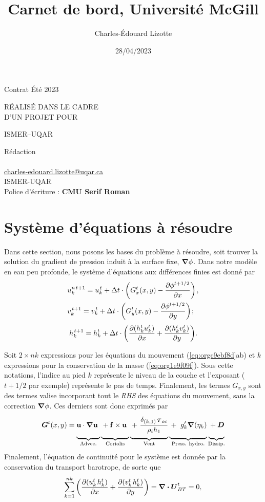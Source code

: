\documentclass[10pt]{article}
\author{Charles-Édouard Lizotte}
\date{28/04/2023}
\title{Carnet de bord, Université McGill}
\makeatletter
\numberwithin{equation}{section}
\newcommand{\uu}{\vb{u}}
\newcommand{\venti}{\vphantom{\sum_x^x}}
\newcommand{\pt}{\hspace{1pt}} %
\newcommand{\mytitlepage}{
\begin{titlepage}
\begin{center}
{\Huge \thesubtitle \par}
\vspace{2cm}
{\Huge \MakeUppercase{\thetitle} \par}
\vspace{2cm}
RÉALISÉ DANS LE CADRE\\ D'UN PROJET POUR \par
\vspace{2cm}
{\Huge ISMER--UQAR \par}
\vspace{2cm}
{\thedate}
\end{center}
\vfill
Rédaction \\
{\theauthor}\\
\url{charles-edouard.lizotte@uqar.ca}\\
ISMER-UQAR\\
Police d'écriture : \textbf{CMU Serif Roman}
\end{titlepage}
}
\newcommand{\thesubtitle}{Contrat Été 2023}
\makeatother
\begin{document}
\mytitlepage
\tableofcontents\newpage

\section{Système d'équations à résoudre}
\label{sec:org2ffca23}

Dans cette section, nous posons les bases du problème à résoudre, soit trouver la solution du gradient de pression induit à la surface fixe, \(\gradient \phi\).
Dans notre modèle en eau peu profonde, le système d'équations aux différences finies est donné par
\begin{subequations}
\label{eq:orgc9ebf8d}
\begin{align}
&u^{n\pt t+1}_k = u^{\pt t}_k + \Delta t \cdot \qty(G^t_x(x,y) - \pdv{\phi^{t+1/2}}{x})\pt,\\
&v^{\pt t+1}_k = v^{\pt t}_k + \Delta t \cdot \qty(G^t_y(x,y) - \pdv{\phi^{t+1/2}}{y})\pt;
\end{align}
\end{subequations}
\begin{equation}
\label{eq:org1e9f09f}
h^{\pt t+1}_k = h^t_k + \Delta t \cdot \qty(\pdv{(h^t_k u^t_k)}{x} + \pdv{(h^t_k v^t_k)}{y}).
\end{equation}

Soit \(2 \times nk\) expressions pour les équations du mouvement (\ref{eq:orgc9ebf8d}ab) et \(k\) expressions pour la conservation de la masse (\ref{eq:org1e9f09f}). 
Sous cette notations, l'indice au pied \(k\) représente le niveau de la couche et l'exposant (\(t+1/2\) par exemple) représente le pas de temps.
Finalement, les termes \(G_{x,y}\) sont des termes valise incorporant tout le \emph{RHS} des équations du mouvement, sans la correction \(\gradient \phi\).
Ces derniers sont donc exprimés par
\begin{equation}
\vb*{G}^t(x,y) =
\underbrace{ \venti\uu \cdot \gradient{\uu}\ }_\text{Advec.}
\underbrace{ \venti + \vb{f}\times \uu\ }_\text{Coriolis} 
\underbrace{ \venti+\pt \frac{\delta_{(k,1)}\pt \boldsymbol{\tau}_{oc}}{\rho_i h_1}}_\text{Vent}
\underbrace{ \venti+\ g'_{k} \gradient(\eta_k)}_\text{Press. hydro.}
\underbrace{ \venti+ \vb*{D}}_\text{Dissip.}
\end{equation}
Finalement, l'équation de continuité pour le système est donnée par la conservation du transport barotrope, de sorte que
\begin{equation}
\label{eq:org4cef23c}
\sum_{k=1}^{nk}  \qty(\pdv{(u^t_k\pt h^t_k)}{x} + \pdv{(v^t_k\pt h^t_k)}{y}) = \div{\vb*{U}^t_{BT}} = 0,
\end{equation}
\end{document}

